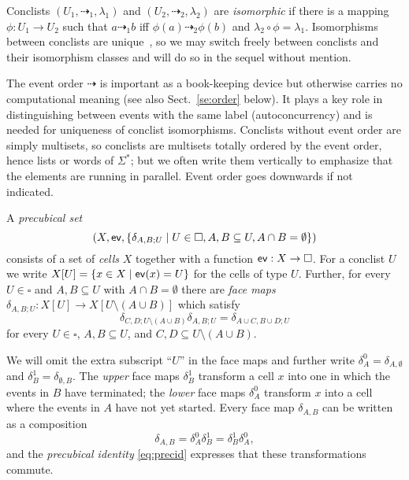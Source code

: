 \documentclass[runningheads,envcountsame]{llncs}
\newcommand*\evord{\dashrightarrow}
\newcommand*\ev{\textup{\textsf{ev}}}
\begin{document}
Conclists $(U_1, {\evord_1}, \lambda_1)$ and $(U_2, {\evord_2}, \lambda_2)$ are \emph{isomorphic}
if there is a mapping $\phi: U_1\to U_2$ such that $a\evord_1 b$ iff $\phi(a)\evord_2 \phi(b)$ and $\lambda_2\circ \phi= \lambda_1$.
Isomorphisms between conclists are unique~\cite{Hdalang},
so we may switch freely between conclists and their isomorphism classes and will do so in the sequel without mention.

\begin{remark}
\label{rem:whyEventOrder}
The event order $\evord$ is important
as a book-keeping device but otherwise carries no computational meaning (see also Sect.~\ref{se:order} below).
It plays a key role in distinguishing between events with the same label (autoconcurrency)
and is needed for uniqueness of conclist isomorphisms.
Conclists without event order are simply multisets,
so conclists are multisets totally ordered by the event order, hence lists or words of $\Sigma^*$;
but we often write them vertically to emphasize that the elements are running in parallel.
Event order goes downwards if not indicated.
\end{remark}

A \emph{precubical set}
\begin{equation*}
  (X, \ev, \{\delta_{A, B; U}\mid U\in \square, A, B\subseteq U, A\cap B=\emptyset\})
\end{equation*}
consists of a set of \emph{cells} $X$
together with a function $\ev: X\to \square$.
For a conclist $U$ we write $X[U]=\{x\in X\mid \ev(x)=U\}$ for the cells of type $U$.
Further, for every $U\in \square$ and $A, B\subseteq U$ with $A\cap B=\emptyset$ there are \emph{face maps}
$\delta_{A, B; U}: X[U]\to X[U\setminus(A\cup B)]$
which satisfy
\begin{equation}
  \label{eq:precid}
  \delta_{C, D; U\setminus(A\cup B)} \delta_{A, B; U}=\delta_{A\cup C, B\cup D; U}
\end{equation}
for every $U\in \square$, $A, B\subseteq U$, and $C, D\subseteq U\setminus(A\cup B)$.

We will omit the extra subscript ``$U$'' in the face maps
and further write $\delta_A^0=\delta_{A, \emptyset}$ and $\delta_B^1=\delta_{\emptyset, B}$.
The \emph{upper} face maps $\delta_B^1$ transform a cell $x$ into one in which the events in $B$ have terminated;
the \emph{lower} face maps $\delta_A^0$ transform $x$ into a cell where the events in $A$ have not yet started.
Every face map $\delta_{A, B}$ can be written as a composition
\begin{equation*}
  \delta_{A, B}=\delta_A^0 \delta_B^1=\delta_B^1 \delta_A^0,
\end{equation*}
and the \emph{precubical identity} \eqref{eq:precid}
expresses  that these transformations commute.
\end{document}

